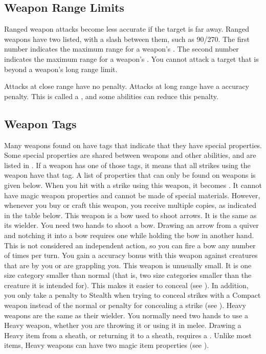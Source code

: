   \subsection{Weapon Range Limits}\label{Weapon Range Limits}
    Ranged weapon attacks become less accurate if the target is far away.
    Ranged weapons have two  listed, with a slash between them, such as 90/270.
    The first number indicates the maximum range for a weapon's .
    The second number indicates the maximum range for a weapon's .
    You cannot attack a target that is beyond a weapon's long range limit.

    Attacks at close range have no penalty.
    Attacks at long range have a  accuracy penalty.
    This is called a , and some abilities can reduce this penalty.

  \subsection{Weapon Tags}\label{Weapon Tags}
    Many weapons found on  have tags that indicate that they have special properties.
    Some special properties are shared between weapons and other abilities, and are listed in .
    If a weapon has one of those tags, it means that all strikes using the weapon have that tag.
    A list of properties that can only be found on weapons is given below.
     When you hit with a strike using this weapon, it becomes .
    It cannot have magic weapon properties and cannot be made of special materials.
    However, whenever you buy or craft this weapon, you receive multiple copies, as indicated in the table below.
     This weapon is a bow used to shoot arrows.
    It is the same  as its wielder.
    You need two hands to shoot a bow.
    Drawing an arrow from a quiver and notching it into a bow requires one  while holding the bow in another hand.
    This is not considered an independent action, so you can fire a bow any number of times per turn.
     You gain a  accuracy bonus with this weapon against creatures that are \grappled by you or are grappling you.
     This weapon is unusually small.
    It is one size category smaller than normal (that is, two size categories smaller than the creature it is intended for).
    This makes it easier to conceal (see ).
    In addition, you only take a  penalty to Stealth when trying to conceal strikes with a Compact weapon instead of the normal  or  penalty for concealing a strike (see ).
     Heavy weapons are the same  as their wielder.
    You normally need two hands to use a Heavy weapon, whether you are throwing it or using it in melee.
    Drawing a Heavy item from a sheath, or returning it to a sheath, requires a .
    Unlike most items, Heavy weapons can have two magic item properties (see ).

